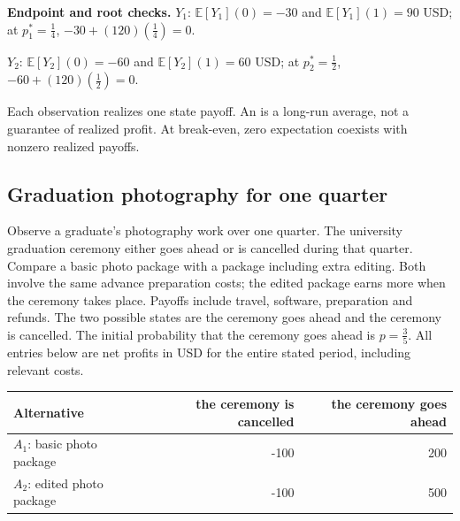 \textbf{Endpoint and root checks.} $Y_1$: $\mathbb E[Y_1](0)=-30$ and $\mathbb E[Y_1](1)=90$ USD; at $p_1^*=\frac{1}{4}$, $-30+(120)(\frac{1}{4})=0$.

$Y_2$: $\mathbb E[Y_2](0)=-60$ and $\mathbb E[Y_2](1)=60$ USD; at $p_2^*=\frac{1}{2}$, $-60+(120)(\frac{1}{2})=0$.

Each observation realizes one state payoff. An  is a long-run average,
not a guarantee of realized profit. At break-even, zero expectation coexists with nonzero realized payoffs.
\clearpage
\subsection{Graduation photography for one quarter}\label{prob:c3-manufacturing}
Observe a graduate's photography work over one quarter. The university graduation ceremony either goes ahead or is cancelled during that quarter. Compare a basic photo package with a package including extra editing. Both involve the same advance preparation costs; the edited package earns more when the ceremony takes place. Payoffs include travel, software, preparation and refunds. The two possible states are the ceremony goes ahead and the ceremony is cancelled. The initial probability that the ceremony goes ahead is $p=\frac{3}{5}$. All entries below are net profits in USD for the entire stated period, including relevant costs.
\begin{center}\begin{tabular}{lrr}\toprule Alternative & the ceremony is cancelled & the ceremony goes ahead\\\midrule
$A_1$: basic photo package & -100 & 200\\
$A_2$: edited photo package & -100 & 500\\
\bottomrule\end{tabular}\end{center}
